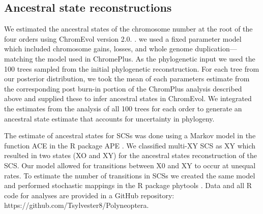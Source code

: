 \subsection{Ancestral state reconstructions}
We estimated the ancestral states of the chromosome number at the root of the four orders using ChromEvol version 2.0. \citep{glick2014chromevol, mayrose2009chromevol}.
we used a fixed parameter model which included chromosome gains, losses, and whole genome duplication---matching the model used in ChromePlus.
As the phylogenetic input we used the 100 trees sampled from the initial phylogenetic reconstruction. 
For each tree from our posterior distribution, we took the mean of each parameters estimate from the corresponding post burn-in portion of the ChromPlus analysis described above and supplied these to infer ancestral states in ChromEvol.
We integrated the estimates from the analysis of all 100 trees for each order to generate an ancestral state estimate that accounts for uncertainty in phylogeny. 

The estimate of ancestral states for SCSs was done using a Markov model in the function ACE in the R package APE \citep{Paradis2018}.
We classified multi-XY SCS as XY which resulted in two states (XO and XY) for the ancestral states reconstruction of the SCS. 
Our model allowed for transitions between X0 and XY to occur at unequal rates.
To estimate the number of transitions in SCSs we created the same model and performed stochastic mappings in the R package phytools \citep{revell2012phytools}.
Data and all R code for analyses are provided in a GitHub repository: https://github.com/Tsylvester8/Polyneoptera. 

